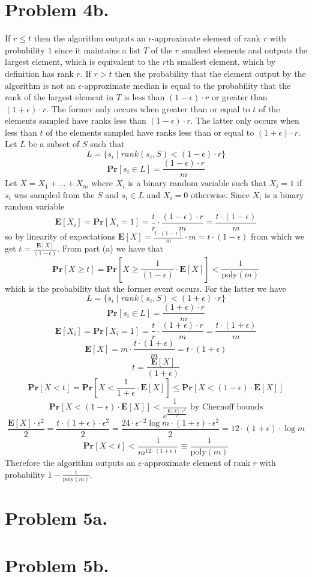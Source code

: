 \documentclass[12pt]{article}
\begin{document}
\newpage
\section*{Problem 4b.}
If $r \le t$ then the algorithm outputs an $\epsilon$-approximate element of
rank $r$ with probability $1$ since it maintains a list $T$ of the $r$ smallest
elements and outputs the largest element, which is equivalent to the
$r$th smallest element, which by definition has rank $r$. If $r > t$ then the
probability that the element output by the algorithm is not an
$\epsilon$-approximate median is equal to the probability that the rank of
the largest element in $T$ is less than $(1-\epsilon)\cdot r$ or greater than
$(1+\epsilon)\cdot r$. The former only occurs when greater than or equal to
$t$ of the elements sampled have ranks less than $(1-\epsilon)\cdot r$. The
latter only occurs when less than $t$ of the elements sampled have ranks less
than or equal to $(1+\epsilon)\cdot r$. Let $L$ be a subset of $S$ such that
$$L = \{s_i \mid rank(s_i, S) < (1-\epsilon)\cdot r\}$$
$$\textbf{Pr}[s_i \in L] = \frac{(1-\epsilon)\cdot r}{m}$$
Let $X = X_1 + ... + X_m$ where $X_i$ is a binary random variable such
that $X_i = 1$ if $s_i$ was sampled from the $S$ and $s_i \in L$ and
$X_i = 0$ otherwise. Since $X_i$ is a binary random variable
$$\textbf{E}[X_i] = \textbf{Pr}[X_i = 1] = \frac{t}{r}\cdot
\frac{(1-\epsilon)\cdot r}{m} = \frac{t\cdot (1-\epsilon)}{m}$$
so by linearity of expectations $\textbf{E}[X] =
\frac{t\cdot (1-\epsilon)}{m}\cdot m = t\cdot(1-\epsilon)$ from which we get
$t = \frac{\textbf{E}[X]}{(1-\epsilon)}$. From part (a) we have that
$$\textbf{Pr}[X \ge t] =
\textbf{Pr}[X \ge \frac{1}{(1-\epsilon)}\cdot \textbf{E}[X]] <
\frac{1}{\text{poly}(m)}$$
which is the probability that the former event occurs. For the latter we have
$$L = \{s_i \mid rank(s_i, S) < (1+\epsilon)\cdot r\}$$
$$\textbf{Pr}[s_i \in L] = \frac{(1+\epsilon)\cdot r}{m}$$
$$\textbf{E}[X_i] = \textbf{Pr}[X_i = 1] = \frac{t}{r}\cdot
\frac{(1+\epsilon)\cdot r}{m} = \frac{t\cdot(1+\epsilon)}{m}$$
$$\textbf{E}[X] = m\cdot \frac{t\cdot(1+\epsilon)}{m}= t\cdot (1+\epsilon)$$
$$t = \frac{\textbf{E}[X]}{(1+\epsilon)}$$
$$\textbf{Pr}[X < t] =
\textbf{Pr}[X < \frac{1}{1+\epsilon}\cdot\textbf{E}[X]] \le
\textbf{Pr}[X < (1-\epsilon)\cdot\textbf{E}[X]]$$
$$\textbf{Pr}[X < (1-\epsilon)\cdot\textbf{E}[X]] <
\frac{1}{e^{\frac{\textbf{E}[X]\cdot\epsilon^2}{2}}}
\text{ by Chernoff bounds}$$
$$\frac{\textbf{E}[X]\cdot\epsilon^2}{2} =
\frac{t\cdot (1+\epsilon)\cdot\epsilon^2}{2} =
\frac{24\cdot\epsilon^{-2}\log m \cdot (1+\epsilon)\cdot\epsilon^2}{2} =
12\cdot(1+\epsilon)\cdot \log m$$
$$\textbf{Pr}[X < t] < \frac{1}{m^{12\cdot(1+\epsilon)}} \equiv
\frac{1}{\text{poly}(m)}$$
Therefore the algorithm outputs an $\epsilon$-approximate element of rank $r$
with probability $1-\frac{1}{\text{poly}(m)}$.

\newpage
\section*{Problem 5a.}

\newpage
\section*{Problem 5b.}
\end{document}
